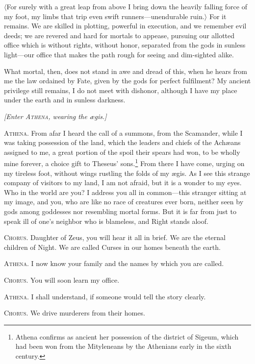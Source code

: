 \documentclass[12pt]{article}
\begin{document}
$\langle$For surely with a great leap from above I bring down the heavily falling force of my foot, my limbs that trip even swift runners---unendurable ruin.$\rangle$ For it remains. We are skilled in plotting, powerful in execution, and we remember evil deeds; we are revered and hard for mortals to appease, pursuing our allotted office which is without rights, without honor, separated from the gods in sunless light---our office that makes the path rough for seeing and dim-sighted alike.

What mortal, then, does not stand in awe and dread of this, when he hears from me the law ordained by Fate, given by the gods for perfect fulfilment? My ancient privilege still remains, I do not meet with dishonor, although I have my place under the earth and in sunless darkness.

\begin{center}
\textit{[Enter \textsc{Athena,} wearing the {\ae}gis.]}
\end{center}

\textsc{Athena.} From afar I heard the call of a summons, from the Scamander, while I was taking possession of the land, which the leaders and chiefs of the Ach{\ae}ans assigned to me, a great portion of the spoil their spears had won, to be wholly mine forever, a choice gift to Theseus' sons.\footnote{Athena confirms as ancient her possession of the district of Sigeum, which had been won from the Mityleneans by the Athenians early in the sixth century.} From there I have come, urging on my tireless foot, without wings rustling the folds of my {\ae}gis. As I see this strange company of visitors to my land, I am not afraid, but it is a wonder to my eyes. Who in the world are you? I address you all in common---this stranger sitting at my image, and you, who are like no race of creatures ever born, neither seen by gods among goddesses nor resembling mortal forms. But it is far from just to speak ill of one's neighbor who is blameless, and Right stands aloof.

\textsc{Chorus.} Daughter of Zeus, you will hear it all in brief. We are the eternal children of Night. We are called Curses in our homes beneath the earth.

\textsc{Athena.} I now know your family and the names by which you are called.

\textsc{Chorus.} You will soon learn my office.

\textsc{Athena.} I shall understand, if someone would tell the story clearly.

\textsc{Chorus.} We drive murderers from their homes.
\end{document}
